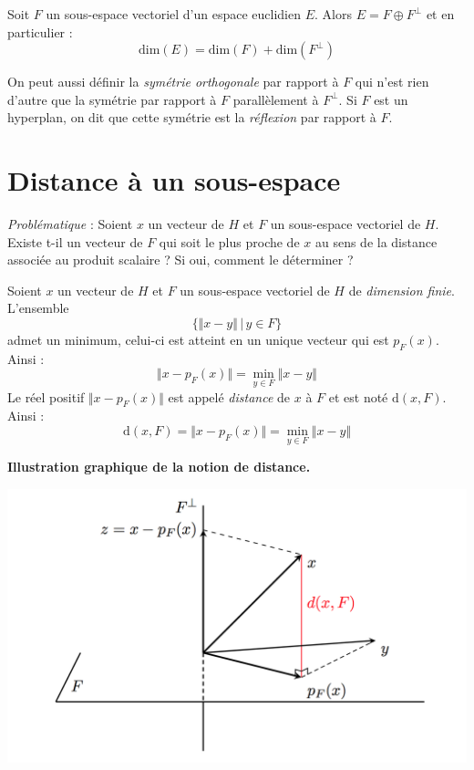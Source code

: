 \documentclass[a4paper,10pt]{report}
\begin{document}
\begin{prop} Soit $F$ un sous-espace vectoriel d'un espace euclidien $E$. Alors $E= F \oplus F^{\perp}$ et en particulier :
$$   \textrm{dim}(E) = \textrm{dim}(F) + \textrm{dim}(F^{\perp})$$
\end{prop}

\begin{rem} On peut aussi définir la \textit{symétrie orthogonale} par rapport à $F$ qui n'est rien d'autre que la symétrie par rapport à $F$ parallèlement à $F^{\perp}$. Si $F$ est un hyperplan, on dit que cette symétrie est la \textit{réflexion} par rapport à $F$.
\end{rem}

\section{Distance à un sous-espace}

\noindent \textit{Problématique} : Soient $x$ un vecteur de $H$ et $F$ un sous-espace vectoriel de $H$. Existe t-il un vecteur de $F$ qui soit \og le plus proche \fg de $x$ au sens de la distance associée au produit scalaire ? Si oui, comment le déterminer ?

\medskip

\begin{thm} Soient $x$ un vecteur de $H$ et $F$ un sous-espace vectoriel de $H$ de \textit{dimension finie}. L'ensemble 
$$ \lbrace \Vert x-y \Vert \, \vert \, y \in F \rbrace$$
admet un minimum, celui-ci est atteint en un unique vecteur qui est $p_F(x)$. Ainsi :
$$ \Vert x - p_F(x) \Vert = \min_{y \in F} \Vert x-y \Vert$$
Le réel positif $\Vert x - p_F(x) \Vert$ est appelé \textit{distance} de $x$ à $F$ et est noté $\textrm{d}(x,F)$. Ainsi :
$$ \textrm{d}(x,F) = \Vert x - p_F(x) \Vert = \min_{y \in F} \Vert x-y \Vert$$
\end{thm}

\begin{center}
\textbf{Illustration graphique de la notion de distance.}
\end{center}

\begin{center}
\includegraphics[scale=0.4]{dist}
\end{center}
\end{document}
